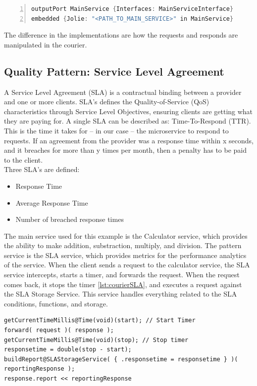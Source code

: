 \documentclass[12pt]{article}
\begin{document}
\begin{lstlisting}[caption=Embed main service into the pattern service, 
    captionpos=b, language=java, label=embedService, frame=single, breaklines=true, numbers=left]
outputPort MainService {Interfaces: MainServiceInterface}
embedded {Jolie: "<PATH_TO_MAIN_SERVICE>" in MainService}
\end{lstlisting}

The difference in the implementations are how the requests and responds are manipulated in the courier.

\subsection{Quality Pattern: Service Level Agreement}
A Service Level Agreement (SLA) \cite{SLA:1} is a contractual binding between a provider and one or more clients. SLA's defines the Quality-of-Service (QoS) \cite{QoS:1} characteristics through Service Level Objectives, ensuring clients are getting what they are paying for. A single SLA can be described as: Time-To-Respond (TTR). This is the time it takes for -- in our case -- the microservice to respond to requests. If an agreement from the provider was a response time within x seconds, and it breaches for more than y times per month, then a penalty has to be paid to the client. \\

Three SLA's are defined:
\begin{itemize}
    \item Response Time
    \item Average Response Time
    \item Number of breached response times
\end{itemize}

The main service used for this example is the Calculator service, which provides the ability to make addition, substraction, multiply, and division. The pattern service is the SLA service, which provides metrics for the performance analytics of the service. When the client sends a request to the calculator service, the SLA service intercepts, starts a timer, and forwards the request. When the request comes back, it stops the timer \ref{lst:courierSLA}, and executes a request against the SLA Storage Service. This service handles everything related to the SLA conditions, functions, and storage. 

\begin{lstlisting}[caption=Courier operations for the SLA service, 
captionpos=b, label=courierSLA, frame=single, breaklines=true]
getCurrentTimeMillis@Time(void)(start); // Start Timer
forward( request )( response );
getCurrentTimeMillis@Time(void)(stop); // Stop timer
responsetime = double(stop - start);
buildReport@SLAStorageService( { .responsetime = responsetime } )( reportingResponse );
response.report << reportingResponse
\end{lstlisting}
\end{document}
